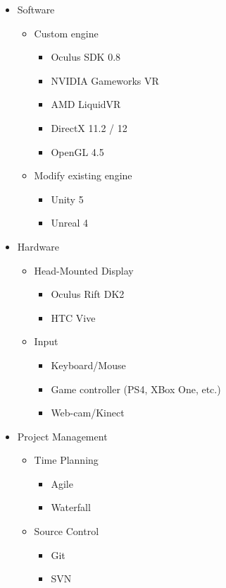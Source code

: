 		\begin{itemize}
			\item Software 
			\begin{itemize}
				\item Custom engine
				\begin{itemize}
					\item Oculus SDK 0.8
					\item NVIDIA Gameworks VR
					\item AMD LiquidVR
					\item DirectX 11.2 / 12
					\item OpenGL 4.5
				\end{itemize}
				\item Modify existing engine
				\begin{itemize}
					\item Unity 5
					\item Unreal 4
				\end{itemize}
			\end{itemize}
			\item Hardware
			\begin{itemize}
				\item Head-Mounted Display
				\begin{itemize}
					\item Oculus Rift DK2
					\item HTC Vive
				\end{itemize}
				\item Input
				\begin{itemize}
					\item Keyboard/Mouse
					\item Game controller (PS4, XBox One, etc.)
					\item Web-cam/Kinect
				\end{itemize}
			\end{itemize}
			\item Project Management
			\begin{itemize}
				\item Time Planning
				\begin{itemize}
					\item Agile
					\item Waterfall
				\end{itemize}
				\item Source Control
				\begin{itemize}
					\item Git
					\item SVN
				\end{itemize}
			\end{itemize}
		\end{itemize}
